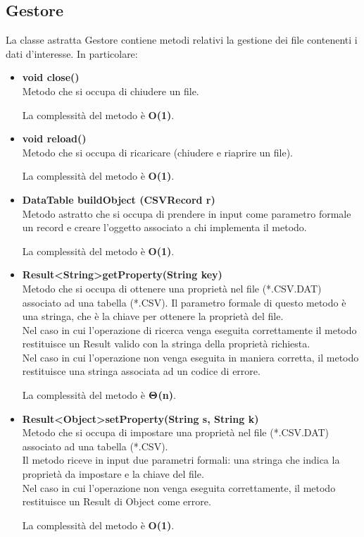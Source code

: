 \documentclass[a4paper, 12pt]{scrreprt}
\begin{document}
			\subsection{Gestore}
			La classe astratta Gestore contiene metodi relativi la gestione dei file contenenti i dati d'interesse. In particolare:
			\begin{itemize}
				\item \textbf{void close()}
				\\Metodo che si occupa di chiudere un file.
				
				La complessit\`a del metodo è \textbf{O(1)}.
				
				\item \textbf{void reload()}
				\\Metodo che si occupa di ricaricare (chiudere e riaprire un file).
				
				La complessit\`a del metodo è \textbf{O(1)}.

				\item \textbf {DataTable buildObject (CSVRecord r)}
				\\Metodo astratto che si occupa di prendere in input come parametro formale un record e creare l'oggetto associato a chi implementa il metodo.
				
				La complessit\`a del metodo è \textbf{O(1)}.

				\item \textbf{Result\textless String\textgreater getProperty(String key)}
				\\Metodo che si occupa di ottenere una propriet\`a nel file (*.CSV.DAT) associato ad una tabella (*.CSV). Il parametro formale di questo metodo \`e una stringa, che \`e la chiave per ottenere la propriet\`a del file.
				\\Nel caso in cui l'operazione di ricerca venga eseguita correttamente il metodo restituisce un Result valido con la stringa della propriet\`a richiesta.
				\\Nel caso in cui l'operazione non venga eseguita in maniera corretta, il metodo restituisce una stringa associata ad un codice di errore.
				
				La complessit\`a del metodo \`e $\mathbf{\Theta}$\textbf{(n)}.

				\item  \textbf{Result\textless Object\textgreater setProperty(String s, String k)}
				\\Metodo che si occupa di impostare una propriet\`a nel file (*.CSV.DAT) associato ad una tabella (*.CSV).
				\\Il metodo riceve in input due parametri formali: una stringa che indica la propriet\`a da impostare e la chiave del file.
				\\Nel caso in cui l'operazione non venga eseguita correttamente, il metodo restituisce un Result di Object come errore.
				
				La complessit\`a del metodo è \textbf{O(1)}.
				
			\end{itemize}
\end{document}

